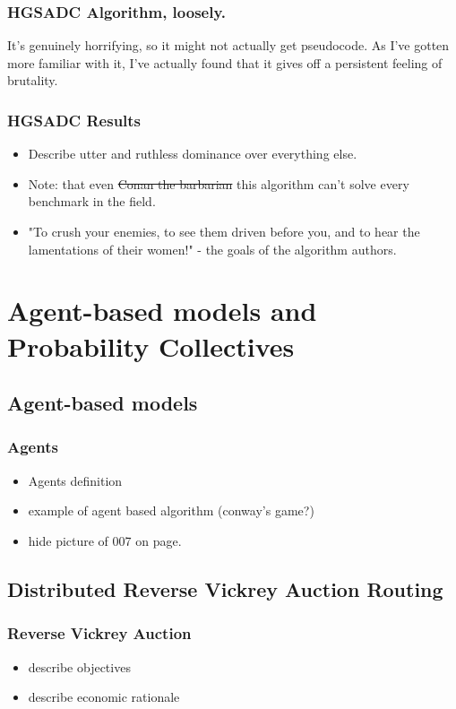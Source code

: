 \documentclass{beamer}
\begin{document}
\begin{frame}
\frametitle{HGSADC Algorithm, loosely.}
 It's genuinely horrifying, so it might not actually get pseudocode. As I've gotten more familiar with it, I've actually found that it gives off a persistent feeling of brutality. 
\end{frame}

\begin{frame}
\frametitle{HGSADC Results}
\begin{itemize}
		\item Describe utter and ruthless dominance over everything else.
		\item Note: that even \st{Conan the barbarian} this algorithm can't solve every benchmark in the field.
		\item "To crush your enemies, to see them driven before you, and to hear the lamentations of their women!" - the goals of the algorithm authors.
		 
	\end{itemize}
\end{frame}

\section{Agent-based models and Probability Collectives}

\subsection{Agent-based models}

\begin{frame}
\frametitle{Agents}
	\begin{itemize}
		\item Agents definition
		\item example of agent based algorithm (conway's game?)
		\item hide picture of 007 on page.
	\end{itemize}
\end{frame}

\subsection{Distributed Reverse Vickrey Auction Routing}

\begin{frame}
\frametitle{Reverse Vickrey Auction}
	\begin{itemize}
		\item describe objectives
		\item describe economic rationale
	\end{itemize}
\end{frame}
\end{document}
